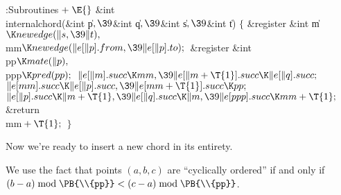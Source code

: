 \Y\B\4:Subroutines\X${}\mathrel+\E{}$\6
\&{int} \\{internalchord}(\&{int} \|p${},\39{}$\&{int} \|q${},\39{}$\&{int} %
\|s${},\39{}$\&{int} \|t)\1\1\2\2\6
${}\{{}$\1\6
\&{register} \&{int} \|m${}\K\\{newedge}(\|s,\39\|t),{}$ \\{mm}${}\K%
\\{newedge}(\|e[\|p].\\{from},\39\|e[\|p].\\{to});{}$\6
\&{register} \&{int} \\{pp}${}\K\\{mate}(\|p),{}$ \\{ppp}${}\K\\{pred}(%
\\{pp});{}$\7
${}\|e[\|m].\\{succ}\K\\{mm},\39\|e[\|m+\T{1}].\\{succ}\K\|e[\|q].\\{succ};{}$\6
${}\|e[\\{mm}].\\{succ}\K\|e[\|p].\\{succ},\39\|e[\\{mm}+\T{1}].\\{succ}\K%
\\{pp};{}$\6
${}\|e[\|p].\\{succ}\K\|m+\T{1},\39\|e[\|q].\\{succ}\K\|m,\39\|e[\\{ppp}].%
\\{succ}\K\\{mm}+\T{1};{}$\6
\&{return} \\{mm}${}+\T{1};{}$\6
\4${}\}{}$\2\par
\fi

Now we're ready to insert a new chord in its entirety.

We use the fact that points $(a,b,c)$ are ``cyclically ordered'' if and
only if $(b-a)\bmod\PB{\\{pp}}<(c-a)\bmod\PB{\\{pp}}$.

